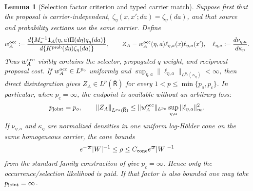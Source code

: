 \documentclass[11pt]{article}
\newtheorem{lemma}[theorem]{Lemma}
\newcommand{\one}{\mathbf 1}
\begin{document}
\begin{lemma}[Selection factor criterion and typed carrier match]
\label{lem:joint-source-factor-criterion}
Suppose first that the proposal is carrier-independent,
$\zeta_\eta(x,x';da)=\zeta_\eta(da)$, and that source and probability
sections use the same carrier.  Define
\begin{equation}
\label{eq:joint-source-likelihood-factorization}
 w_A^{\rm occ}:=
 \frac{d\{M_*^{-1}\one_A(\eta,a)\Pi(d\eta)q_\eta(da)\}}
      {d\{K^{\rm prob}(d\eta)\zeta_\eta(da)\}},
 \qquad
 Z_A=w_A^{\rm occ}(\eta,a)
      \ell_{\eta,a}(x)\ell_{\eta,a}(x'),
 \quad
 \ell_{\eta,a}:=\frac{d\nu_{\eta,a}}{d\kappa_\eta}.
\end{equation}
Thus $w_A^{\rm occ}$ visibly contains the selector, propagated $q$ weight,
and reciprocal proposal cost.  If $w_A^{\rm occ}\in L^{p_o}$ uniformly and
$\sup_{\eta,a}\|\ell_{\eta,a}\|_{L^{p_c}(\kappa_\eta)}<\infty$, then direct
disintegration gives $Z_A\in L^p(\overline{\mathsf R})$ for every
$1<p\le\min\{p_o,p_c\}$.  In particular, when $p_c=\infty$, the endpoint is
available without an arbitrary loss:
\begin{equation}
\label{eq:same-carrier-holder-endpoint}
 p_{\rm joint}=p_o,
 \qquad
 \|Z_A\|_{L^{p_o}(\overline{\mathsf R})}
 \le \|w_A^{\rm occ}\|_{L^{p_o}}
       \sup_{\eta,a}\|\ell_{\eta,a}\|_\infty^2.
\end{equation}
If $\nu_{\eta,a}$ and $\kappa_{\eta}$ are normalized densities in one
uniform log-H\"older cone on the same homogeneous carrier, the cone bounds
\[
 e^{-\varpi}|W|^{-1}\le\rho\le
 C_{\rm cone}e^{\varpi}|W|^{-1}
\]
from the standard-family construction of \cite{CanestrariHoles} give
$p_c=\infty$.  Hence only the occurrence/selection likelihood is paid.  If
that factor is also bounded one may take $p_{\rm joint}=\infty$.


\end{lemma}
\end{document}
